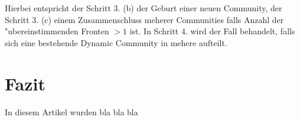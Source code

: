 \documentclass[journal]{vgtc}
\begin{document}
    Hierbei entspricht der Schritt 3. (b) der Geburt einer neuen Community, der Schritt 3. (c) einem Zusammenschluss meherer Communities falls Anzahl der "ubereinstimmenden
    Fronten $>1$ ist. In Schritt 4. wird der Fall behandelt, falls sich eine bestehende Dynamic Community in mehere aufteilt.

\section{Fazit}
  In diesem Artikel wurden bla bla bla


\end{document}
